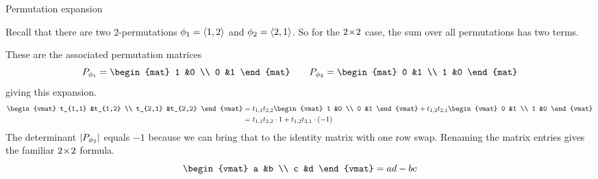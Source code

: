 \documentclass[10pt,t]{beamer}
\begin{document}
\begin{frame}{Permutation expansion}
\df[df:PermutationExpansion]

\pause
\medskip
{}
\end{frame}
\begin{frame}
\ex
Recall that there are two $2$-permutations
\( \phi_1=\langle1,2\rangle \) and \( \phi_2=\langle2,1\rangle \).
So for the $2 \! \times \! 2$ case, the sum over all permutations has two terms.

\pause
These are the associated permutation matrices
\begin{equation*}
  P_{\phi_1}=
  \begin{mat}
    1 &0 \\
    0 &1
  \end{mat}
  \qquad
  P_{\phi_2}=
  \begin{mat}
    0 &1 \\
    1 &0
  \end{mat}
\end{equation*}
\pause
giving this expansion.
\begin{align*}
  \begin{vmat}
    t_{1,1}  &t_{1,2} \\
    t_{2,1}  &t_{2,2}
  \end{vmat}
  &=
  t_{1,1}t_{2,2}
  \begin{vmat}
    1  &0 \\
    0  &1
  \end{vmat}               
  +
  t_{1,2}t_{2,1}
  \begin{vmat}
    0  &1 \\
    1  &0
  \end{vmat}               \\
  &=
  t_{1,1}t_{2,2}\cdot 1
  +
  t_{1,2}t_{2,1}\cdot (-1)
\end{align*}
The determinant $\deter{P_{\phi_2}}$ equals $-1$ because we can bring that to 
the identity matrix with one row swap.
\pause
Renaming the matrix entries gives the familiar $2 \! \times \! 2$ formula.
\begin{equation*}
  \begin{vmat}
    a  &b  \\
    c  &d
  \end{vmat}
  =ad-bc
\end{equation*}
\end{frame}
\end{document}
